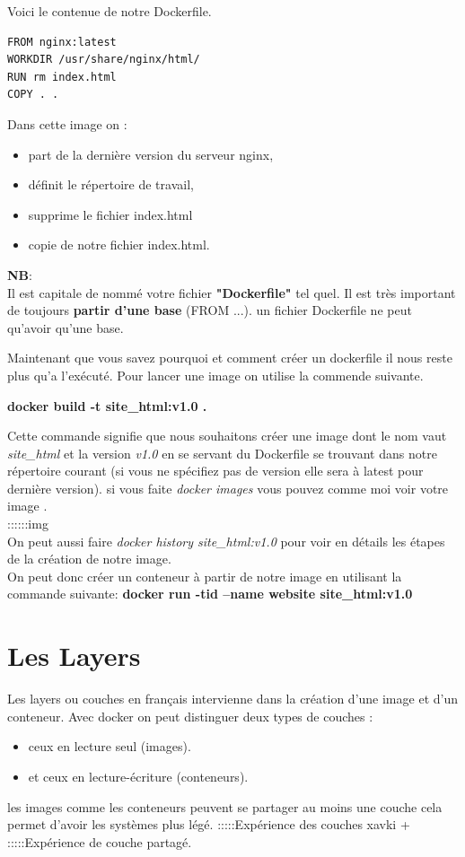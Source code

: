 \documentclass[12pt,a4paper]{article}
\begin{document}
Voici le contenue de notre Dockerfile.

\begin{verbatim}
FROM nginx:latest
WORKDIR /usr/share/nginx/html/
RUN rm index.html
COPY . .
\end{verbatim}

Dans cette image on :
\begin{itemize}
\item part de la dernière version du serveur nginx,
\item définit le répertoire de travail,
\item supprime le fichier index.html
\item copie de notre fichier index.html.
\end{itemize} 

\textbf{NB}: \\
Il est capitale de nommé votre fichier \textbf{"Dockerfile"} tel quel.
Il est très important de toujours \textbf{partir d'une base} (FROM ...).
un fichier Dockerfile ne peut qu'avoir qu'une base.

Maintenant que vous savez pourquoi et comment créer un dockerfile il nous reste plus
qu'a l'exécuté. Pour lancer une image on utilise la commende suivante.

\textbf{docker build -t site\_html:v1.0 .}

Cette commande signifie que nous souhaitons créer une image dont le nom vaut \textit{site\_html}
et la version \textit{v1.0} en se servant du Dockerfile se trouvant dans notre répertoire 
courant (si vous ne spécifiez pas de version elle sera à latest pour dernière version).
si vous faite \textit{docker images} vous pouvez comme moi voir votre image .\\
::::::img\\
On peut aussi faire \textit{docker history site\_html:v1.0} pour voir en détails les étapes de 
la création de notre image.\\

On peut donc créer un conteneur à partir de notre image en utilisant la commande suivante:
\textbf{docker run -tid --name website site\_html:v1.0}

\section{Les Layers}
Les layers ou couches en français intervienne dans la création d'une image et d'un conteneur. Avec docker on peut distinguer deux types de couches :
\begin{itemize}
\item ceux en lecture seul (images).
\item et ceux en lecture-écriture (conteneurs).
\end{itemize} 
les images comme les conteneurs peuvent se partager au moins une couche cela permet d'avoir les systèmes plus légé.
:::::Expérience des couches xavki +
:::::Expérience de couche partagé.
\end{document}
